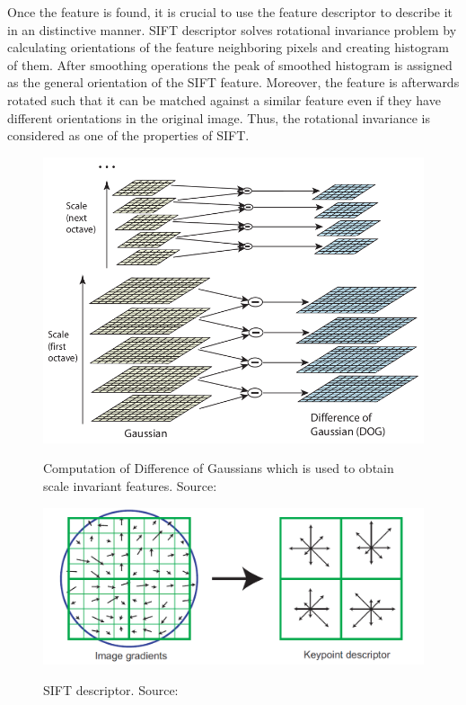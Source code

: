 Once the feature is found, it is crucial to use the feature descriptor to describe it in an distinctive manner.  SIFT descriptor solves rotational invariance problem by calculating orientations of the feature neighboring pixels and creating histogram of them. After smoothing operations the peak of smoothed histogram is assigned as the general orientation of the SIFT feature. Moreover, the feature is afterwards rotated such that it can be matched against a similar feature even if they have different orientations in the original image. Thus, the rotational invariance is considered as one of the properties of SIFT.

\begin{figure}
\centering

{\includegraphics[width=0.8\columnwidth]{figures/dog.png}}

\caption{Computation of Difference of Gaussians which is used to obtain scale invariant features. Source:~\cite{lowe2004distinctive}}
\label{fig:dog}
\end{figure}


\begin{figure}
\centering

{\includegraphics[width=0.8\columnwidth]{figures/sift.png}}

\caption{SIFT descriptor. Source:~\cite{lowe2004distinctive}}
\label{fig:sift}
\end{figure}

